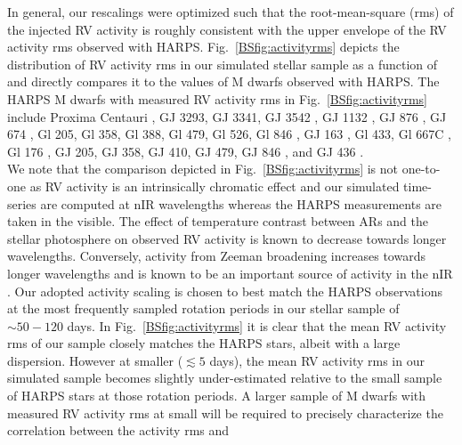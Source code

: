 In general, our rescalings were optimized such that the root-mean-square (rms) of the injected RV activity is
roughly consistent with the upper envelope of the RV activity rms observed with HARPS.
Fig.~\ref{BSfig:activityrms} depicts the distribution of RV activity rms in our simulated stellar
sample as a function of \prot{} and directly compares it to the values of M dwarfs observed with HARPS.
The HARPS M dwarfs with measured RV activity rms in Fig.~\ref{BSfig:activityrms} include
Proxima Centauri \citep{angladaescude16},
GJ 3293, GJ 3341, GJ 3542 \citep{astudillodefru15},
GJ 1132 \citep{berta15}, 
GJ 876 \citep{correia10},
GJ 674 \citep{bonfils07},
Gl 205, Gl 358, Gl 388, Gl 479, Gl 526, Gl 846 \citep{bonfils13},
GJ 163 \citep{bonfils13b},
Gl 433, Gl 667C \citep{delfosse13b},
Gl 176 \citep{forveille09},
GJ 205, GJ 358, GJ 410, GJ 479, GJ 846 \citep{hebrard16},
and GJ 436 \citep{lanotte14}.  \\

We note that the comparison depicted in Fig.~\ref{BSfig:activityrms}
is not one-to-one as RV activity is an intrinsically chromatic effect and our
simulated time-series are computed at nIR wavelengths whereas the HARPS measurements are taken in the
visible. The effect of temperature contrast between ARs and the stellar photosphere on observed RV activity
is known to decrease towards longer wavelengths. Conversely, activity from Zeeman broadening increases towards
longer wavelengths and is known to be an important source of activity in the nIR \citep{hebrard14,moutou17}.
Our adopted activity scaling is chosen to best match the HARPS observations at the most frequently sampled rotation periods
in our stellar sample of $\sim 50-120$ days. In Fig.~\ref{BSfig:activityrms} it is clear that the mean RV activity rms
of our sample closely matches the HARPS stars, albeit with a large dispersion.
However at smaller \prot{} ($\lesssim 5$ days),
the mean RV activity rms in our simulated sample becomes slightly under-estimated relative to
the small sample of HARPS stars at those rotation periods. A larger sample of M dwarfs with measured RV activity rms at 
small \prot{} will be required to precisely characterize the correlation between the activity rms and

